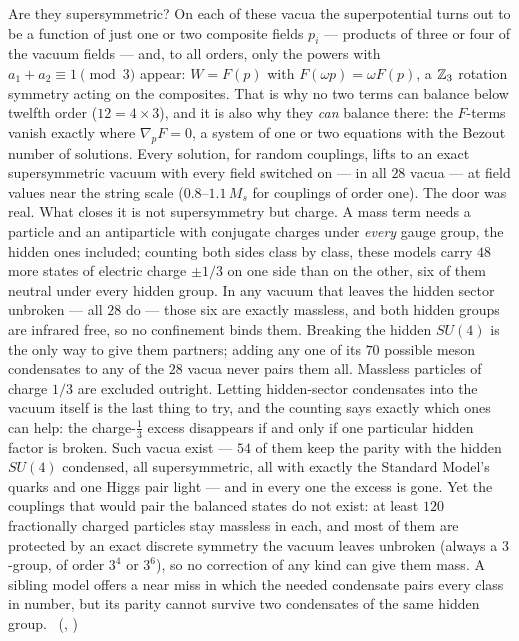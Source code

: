 Are they supersymmetric? On each of these vacua the superpotential turns out to be a function of just one or two
composite fields $p_i$ --- products of three or four of the vacuum fields --- and, to all orders, only the powers
with $a_1+a_2\equiv1\pmod3$ appear: $W=F(p)$ with $F(\omega p)=\omega F(p)$, a $\mathbb{Z}_3$ rotation symmetry acting on
the composites. That is why no two terms can balance below twelfth order ($12=4\times3$), and it is also why they
\emph{can} balance there: the $F$-terms vanish exactly where $\nabla_pF=0$, a system of one or two equations with
the Bezout number of solutions. Every solution, for random couplings, lifts to an exact supersymmetric vacuum
with every field switched on --- in all $28$ vacua --- at field values near the string scale
($0.8$--$1.1\,M_s$ for couplings of order one). The door was real. What closes it is not supersymmetry but
charge. A mass term needs a particle and an antiparticle with conjugate charges under \emph{every} gauge group,
the hidden ones included; counting both sides class by class, these models carry $48$ more states of electric
charge $\pm1/3$ on one side than on the other, six of them neutral under every hidden group. In any vacuum that
leaves the hidden sector unbroken --- all $28$ do --- those six are exactly massless, and both hidden groups are
infrared free, so no confinement binds them. Breaking the hidden $SU(4)$ is the only way to give them partners;
adding any one of its $70$ possible meson condensates to any of the $28$ vacua never pairs them all. Massless
particles of charge $1/3$ are excluded outright. Letting hidden-sector condensates into the vacuum itself is the
last thing to try, and the counting says exactly which ones can help: the charge-$\tfrac13$ excess disappears if
and only if one particular hidden factor is broken. Such vacua exist --- $54$ of them keep the parity with the
hidden $SU(4)$ condensed, all supersymmetric, all with exactly the Standard Model's quarks and one Higgs pair
light --- and in every one the excess is gone. Yet the couplings that would pair the balanced states do not
exist: at least $120$ fractionally charged particles stay massless in each, and most of them are protected by an
exact discrete symmetry the vacuum leaves unbroken (always a $3$-group, of order $3^4$ or $3^6$), so no correction of any
kind can give them mass. A sibling model offers a near miss in which the needed condensate pairs every class in
number, but its parity cannot survive two condensates of the same hidden group. \tierC\ (,
)

